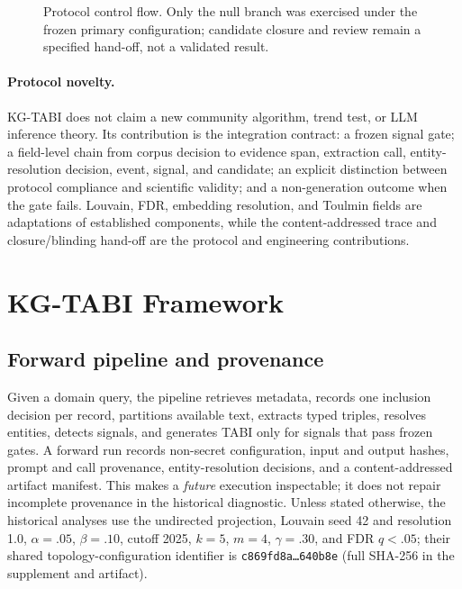 \documentclass[runningheads]{llncs}
\begin{document}
\begin{figure}[t]
\centering
{}
\caption{Protocol control flow. Only the null branch was exercised under the frozen primary configuration; candidate closure and review remain a specified hand-off, not a validated result.}
\label{fig:protocol-flow}
\end{figure}

\paragraph{Protocol novelty.} KG-TABI does not claim a new community algorithm, trend test, or LLM inference theory. Its contribution is the integration contract: a frozen signal gate; a field-level chain from corpus decision to evidence span, extraction call, entity-resolution decision, event, signal, and candidate; an explicit distinction between protocol compliance and scientific validity; and a non-generation outcome when the gate fails. Louvain, FDR, embedding resolution, and Toulmin fields are adaptations of established components, while the content-addressed trace and closure/blinding hand-off are the protocol and engineering contributions.

\section{KG-TABI Framework}
\subsection{Forward pipeline and provenance}
Given a domain query, the pipeline retrieves metadata, records one inclusion decision per record, partitions available text, extracts typed triples, resolves entities, detects signals, and generates TABI only for signals that pass frozen gates. A forward run records non-secret configuration, input and output hashes, prompt and call provenance, entity-resolution decisions, and a content-addressed artifact manifest. This makes a \emph{future} execution inspectable; it does not repair incomplete provenance in the historical diagnostic. Unless stated otherwise, the historical analyses use the undirected projection, Louvain seed 42 and resolution 1.0, $\alpha=.05$, $\beta=.10$, cutoff 2025, $k=5$, $m=4$, $\gamma=.30$, and FDR $q<.05$; their shared topology-configuration identifier is \texttt{c869fd8a\ldots640b8e} (full SHA-256 in the supplement and artifact).
\end{document}
